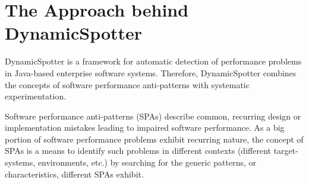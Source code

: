 \documentclass{report}
\newcommand{\DS}{DynamicSpotter }
\begin{document}
% 
% 
% 
\tableofcontents
\newpage


\section{The Approach behind \DS}
\label{sec:approach}
\DS is a framework for automatic detection of performance problems in Java-based enterprise software systems. Therefore,
\DS combines the concepts of software performance anti-patterns with systematic experimentation. 

Software performance
anti-patterns (SPAs) \cite{smith2000software,smith2002software,smith2003more,smith2003new} describe common, recurring
design or implementation mistakes leading to impaired software performance. As a big portion of software performance
problems exhibit recurring nature, the concept of SPAs is a means to identify such problems in different
contexts (different target-systems, environments, etc.) by searching for the generic patterns, or characteristics,
different SPAs exhibit. 
\end{document}

